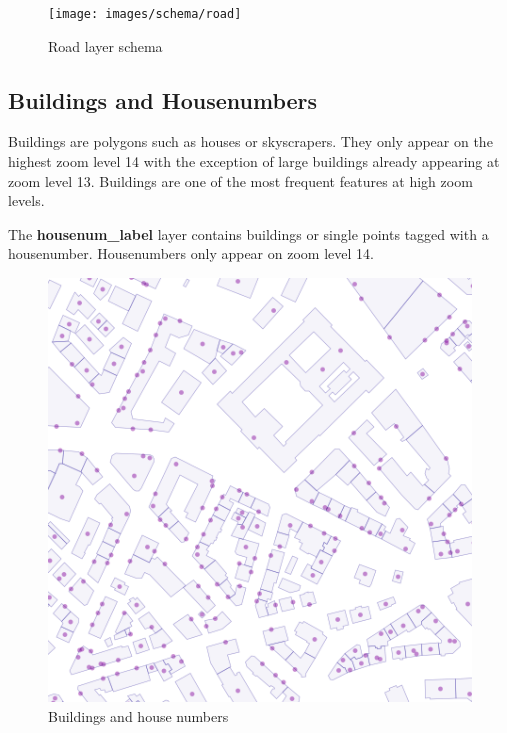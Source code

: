 \begin{figure}[H]
  \centering
  \texttt{[image: images/schema/road]}
  \caption{Road layer schema}
\end{figure}



\subsection{Buildings and Housenumbers}

\noindent\begin{minipage}[t]{0.48\linewidth}
    \vspace{0pt}
    Buildings are polygons such as houses or skyscrapers. They only appear on the highest zoom level 14 with the exception of large buildings already appearing at zoom level 13. Buildings are one of the most frequent features at high zoom levels.
    
    The \textbf{housenum\_label}  layer contains buildings or single points tagged with a housenumber. Housenumbers only appear on zoom level 14.

\end{minipage}
\hfill
\begin{minipage}[t]{0.48\linewidth}
    \vspace{-20pt}
    \begin{figure}[H]
      \includegraphics[width=1\textwidth]{images/schema/building_example}
      \caption{Buildings and house numbers}
    \end{figure}
\end{minipage}


